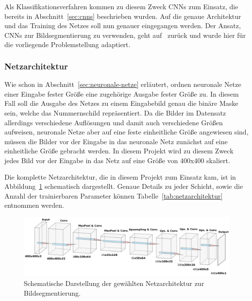 Als Klassifikationsverfahren kommen zu diesem Zweck CNNs zum Einsatz,
die bereits in Abschnitt~\ref{sec:cnns} beschrieben wurden.
Auf die genaue Architektur und das Training des Netzes soll nun genauer
eingegangen werden.
Der Ansatz, CNNs zur Bildsegmentierung zu verwenden, geht
auf~\cite{image-segmentation} zur\"uck und wurde hier f\"ur die
vorliegende Problemstellung adaptiert.

\subsubsection{Netzarchitektur}

Wie schon in Abschnitt~\ref{sec:neuronale-netze} erl\"autert, ordnen
neuronale Netze einer Eingabe fester Gr\"o{\ss}e eine zugeh\"orige
Ausgabe fester Gr\"o{\ss}e zu.
In diesem Fall soll die Ausgabe des Netzes zu einem Eingabebild
genau die bin\"are Maske sein, welche das Nummernschild repr\"asentiert.
Da die Bilder im Datensatz allerdings verschiedene Aufl\"osungen
und damit auch verschiedene Gr\"o{\ss}en aufweisen, neuronale Netze
aber auf eine feste einheitliche Gr\"o{\ss}e angewiesen sind,
m\"ussen die Bilder vor der Eingabe in das neuronale Netz
zun\"achst auf eine einheitliche Gr\"o{\ss}e gebracht werden.
In diesem Projekt wird zu diesem Zweck jedes Bild vor der Eingabe
in das Netz auf eine Gr\"o{\ss}e von 400x400 skaliert.

Die komplette Netzarchitektur, die in diesem Projekt zum Einsatz kam,
ist in Abbildung~\ref{fig:netzarchitektur} schematisch dargestellt.
Genaue Details zu jeder Schicht, sowie die Anzahl der trainierbaren
Parameter k\"onnen Tabelle~\ref{tab:netzarchitektur} entnommen werden.

\begin{figure}
    \centering
    \includegraphics[width=\textwidth]{abbildungen/network_architecture}
    \caption[Netzarchitektur]{Schematische Darstellung der gew\"ahlten Netzarchitektur
        zur Bildsegmentierung.}
    \label{fig:netzarchitektur}
\end{figure}

